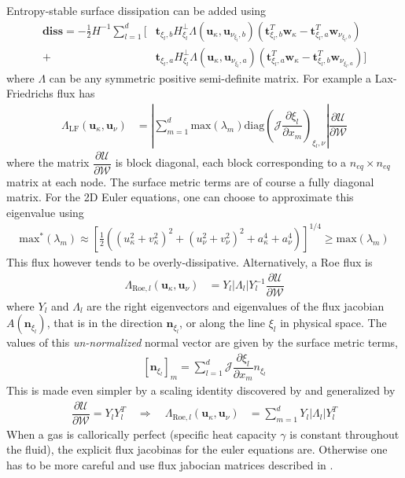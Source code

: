 \documentclass[12pt,a4paper]{article}
\newcommand{\pder}[2][]{\dfrac{\partial #1}{\partial #2}} %
\newcommand{\fn}[1]{\mathcal{#1}} %
\newcommand{\fnb}[1]{\bm{\mathcal{#1}}} %
\begin{document}
Entropy-stable surface dissipation can be added using
\begin{align*}
 \textbf{diss} = - \frac{1}{2} H^{-1} \sum_{l=1}^d \bigg[ & \bm{t}_{\xi_l, b} H^{\bot}_{\xi_l} \Lambda ( \bm{u}_\kappa , \bm{u}_{\nu_{\xi_l},b} ) 
 \left( \bm{t}_{\xi_l, b}^T \bm{w}_\kappa - \bm{t}_{\xi_l, a}^T \bm{w}_{\nu_{\xi_l , b}} \right) \\ + 
& \bm{t}_{\xi_l, a} H^{\bot}_{\xi_l} \Lambda ( \bm{u}_\kappa , \bm{u}_{\nu_{\xi_l},a} ) 
 \left( \bm{t}_{\xi_l, a}^T \bm{w}_\kappa - \bm{t}_{\xi_l, b}^T \bm{w}_{\nu_{\xi_l , a}} \right) \bigg]
\end{align*}
where $\Lambda$ can be any symmetric positive semi-definite matrix. For example a Lax-Friedrichs flux has
\begin{align*}
\Lambda_{\text{LF}} ( \bm{u}_\kappa , \bm{u}_\nu ) &= \left\vert \sum_{m=1}^d \text{max} \left( {\lambda_m} \right) \text{diag} \left( \fn{J} \pder[\xi_l]{x_m} \right)_{\xi_l,\nu}  \right\vert \pder[\fnb{U}]{\fnb{W}} 
\end{align*}
where the matrix $\pder[\fnb{U}]{\fnb{W}}$ is block diagonal, each block corresponding to a $n_{eq} \times n_{eq}$ matrix at each node. The surface metric terms are of course a fully diagonal matrix. For the 2D Euler equations, one can choose to approximate this eigenvalue using \cite{carpenter_entropy_2014}
\begin{align*}
\text{max}^* \left( {\lambda_m} \right) \approx \left[ \frac{1}{2} \left( \left( u_\kappa^2 + v_\kappa^2 \right)^2 + \left( u_\nu^2 + v_\nu^2 \right)^2 + a_\kappa^4 + a_\nu^4 \right) \right]^{1/4} \geq \text{max} \left( {\lambda_m} \right)
\end{align*}
This flux however tends to be overly-dissipative. Alternatively, a Roe flux is
\begin{align*}
\Lambda_{\text{Roe}, l} ( \bm{u}_\kappa , \bm{u}_\nu ) &=  Y_l \left\vert \Lambda_l \right\vert Y^{-1}_l \pder[\fnb{U}]{\fnb{W}}
\end{align*}
where $Y_l$ and $\Lambda_l$ are the right eigenvectors and eigenvalues of the flux jacobian $A( \bm{n}_{\xi_l} )$, that is in the direction $ \bm{n}_{\xi_l} $, or along the line $\xi_l$ in physical space. The values of this \textit{un-normalized} normal vector are given by the surface metric terms,
\begin{align*}
\left[ \bm{n}_{\xi_l} \right]_m = \sum_{l=1}^d \fn{J} \pder[\xi_l]{x_m} n_{\xi_l}
\end{align*}
This is made even simpler by a scaling identity discovered by \cite{merriam_entropy-based_1989} and generalized by \cite{barth_numerical_1999}
\begin{align*}
\pder[\fnb{U}]{\fnb{W}} = Y_l  Y_l^T \quad \Rightarrow \quad \Lambda_{\text{Roe}, l} ( \bm{u}_\kappa , \bm{u}_\nu ) &=  \sum_{m=1}^d Y_l \left\vert \Lambda_l \right\vert Y_l^T 
\end{align*}
When a gas is callorically perfect (specific heat capacity $\gamma$ is constant throughout the fluid), the explicit flux jacobinas for the euler equations are. Otherwise one has to be more careful and use flux jabocian matrices described in \cite{fisher_high_2012}.
\end{document}
